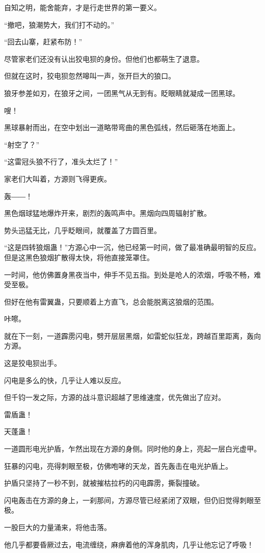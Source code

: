 \begin{this_body}
自知之明，能舍能弃，才是行走世界的第一要义。

“撤吧，狼潮势大，我们打不动的。”

“回去山寨，赶紧布防！”

尽管家老们还没有认出狡电狈的身份。但他们也都萌生了退意。

但就在这时，狡电狈忽然嗥叫一声，张开巨大的狼口。

狼牙参差如刃，在狼牙之间，一团黑气从无到有。眨眼睛就凝成一团黑球。

嗖！

黑球暴射而出，在空中划出一道略带弯曲的黑色弧线，然后砸落在地面上。

“射空了？”

“这雷冠头狼不行了，准头太烂了！”

家老们大叫着，方源则飞得更疾。

轰――！

黑色烟球猛地爆炸开来，剧烈的轰鸣声中。黑烟向四周辐射扩散。

势头迅猛无比，几乎眨眼间，就覆盖了方圆百里。

“这是四转狼烟蛊！”方源心中一沉，他已经第一时间，做了最准确最明智的反应。但是这黑色狼烟扩散得太快，将他直接笼罩住。

一时间，他仿佛置身黑夜当中，伸手不见五指。到处是呛人的浓烟，呼吸不畅，难受至极。

但好在他有雷翼蛊，只要顺着上方直飞，总会能脱离这狼烟的范围。

咔嚓。

就在下一刻，一道霹雳闪电，劈开层层黑烟，如雷蛇似狂龙，跨越百里距离，轰向方源。

这是狡电狈出手。

闪电是多么的快，几乎让人难以反应。

但千钧一发之际，方源的战斗意识超越了思维速度，优先做出了应对。

雷盾蛊！

天蓬蛊！

一道圆形电光护盾，乍然出现在方源的身侧。同时他的身上，亮起一层白光虚甲。

狂暴的闪电，亮得刺眼至极，仿佛咆哮的天龙，首先轰击在电光护盾上。

护盾只坚持了一秒不到，就被摧枯拉朽的闪电霹雳，撕裂撞破。

闪电轰击在方源的身上，一刹那间，方源尽管已经紧闭了双眼，但仍旧觉得刺眼至极。

一股巨大的力量涌来，将他击落。

他几乎都要昏厥过去，电流缠绕，麻痹着他的浑身肌肉，几乎让他忘记了呼吸！


\end{this_body}
